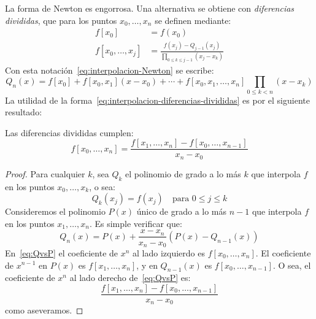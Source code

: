   La forma de Newton es engorrosa.
  Una alternativa se obtiene con \emph{diferencias divididas},
  que para los puntos \(x_0, \dotsc, x_n\) se definen mediante:
  \begin{align*}
    f[x_0]
      &= f(x_0) \\
    f[x_0, \dotsc, x_j]
      &= \frac{f(x_j) - Q_{j - 1}(x_j)}{\prod_{0 \le k \le j - 1} (x_j - x_k)}
  \end{align*}
  Con esta notación~\eqref{eq:interpolacion-Newton}
  se escribe:
  \begin{equation}
    \label{eq:interpolacion-diferencias-divididas}
    Q_n(x)
      = f[x_0]
          + f[x_0, x_1] (x - x_0)
          + \dotsb
          + f[x_0, x_1, \dotsc, x_n] \prod_{0 \le k < n}(x - x_k)
  \end{equation}
  La utilidad de la forma~\eqref{eq:interpolacion-diferencias-divididas}
  es por el siguiente resultado:
  \begin{lemma}
    Las diferencias divididas cumplen:
    \begin{equation}
      \label{eq:divided-differences-recurrence}
      f[x_0, \dotsc, x_n]
        = \frac{f[x_1, \dotsc, x_n] - f[x_0, \dotsc, x_{n - 1}]}
               {x_n - x_0}
    \end{equation}
  \end{lemma}
  \begin{proof}
    Para cualquier \(k\),
    sea \(Q_k\) el polinomio de grado a lo más \(k\)
    que interpola \(f\) en los puntos \(x_0, \dotsc, x_k\),
    o sea:
    \begin{equation*}
      Q_k(x_j)
        = f(x_j)
           \quad \text{para \(0 \le j \le k\)}
    \end{equation*}
    Consideremos el polinomio \(P(x)\) único de grado a lo más \(n - 1\)
    que interpola \(f\) en los puntos \(x_1, \dotsc, x_n\).
    Es simple verificar que:
    \begin{equation}
      \label{eq:QvsP}
      Q_n(x)
        = P(x) + \frac{x - x_n}{x_n - x_0} (P(x) - Q_{n - 1}(x))
    \end{equation}
    En~\eqref{eq:QvsP} el coeficiente de \(x^n\) al lado izquierdo
    es \(f[x_0, \dotsc, x_n]\).
    El coeficiente de \(x^{n - 1}\) en \(P(x)\)
    es \(f[x_1, \dotsc, x_n]\),
    y en \(Q_{n - 1}(x)\)
    es \(f[x_0, \dotsc, x_{n - 1}]\).
    O sea,
    el coeficiente de \(x^n\) al lado derecho de~\eqref{eq:QvsP}
    es:
    \begin{equation*}
      \frac{f[x_1, \dotsc, x_n] - f[x_0, \dotsc, x_{n - 1}]}
           {x_n - x_0}
    \end{equation*}
    como aseveramos.
  \end{proof}

